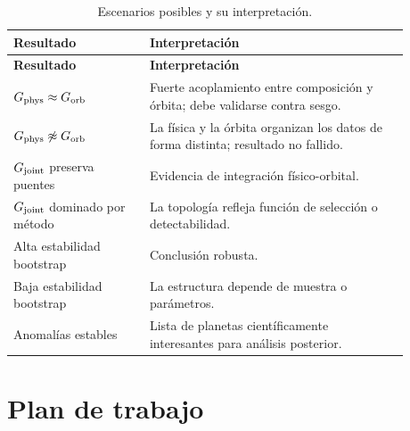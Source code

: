 \documentclass[11pt,letterpaper]{article}
\newcommand{\phys}{\rm phys}
\newcommand{\orb}{\rm orb}
\newcommand{\joint}{\rm joint}
\begin{document}
\begin{longtable}{p{0.30\linewidth}p{0.58\linewidth}}
\caption{Escenarios posibles y su interpretación.}\\
\toprule
\textbf{Resultado} & \textbf{Interpretación} \\
\midrule
\endfirsthead
\toprule
\textbf{Resultado} & \textbf{Interpretación} \\
\midrule
\endhead
$G_{\phys}\approx G_{\orb}$ & Fuerte acoplamiento entre composición y órbita; debe validarse contra sesgo. \\
$G_{\phys}\not\approx G_{\orb}$ & La física y la órbita organizan los datos de forma distinta; resultado no fallido. \\
$G_{\joint}$ preserva puentes & Evidencia de integración físico-orbital. \\
$G_{\joint}$ dominado por método & La topología refleja función de selección o detectabilidad. \\
Alta estabilidad bootstrap & Conclusión robusta. \\
Baja estabilidad bootstrap & La estructura depende de muestra o parámetros. \\
Anomalías estables & Lista de planetas científicamente interesantes para análisis posterior. \\
\bottomrule
\end{longtable}

\section{Plan de trabajo}
\end{document}
